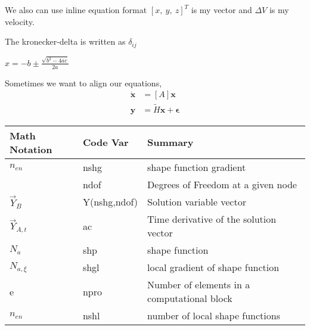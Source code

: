 \documentclass[12pt]{article}
\begin{document}
We also can use inline equation format $[x,~y,~z]^T$ is my vector and $\Delta V$ is my velocity.

The kronecker-delta is written as $\delta _{ij}$

\begin{center}
$x=-b \pm \displaystyle \frac{\sqrt{b^2-4ac}}{2a}$
\end{center}

Sometimes we want to align our equations,
\begin{align}
\dot{\pmb{x}} &= [A]\pmb{x}\\
\pmb{y} &=\tilde{H}\pmb{x} + \pmb{\epsilon}
\end{align}

\begin{tabular}{ | l | l | l |}
		\hline
		Math Notation & Code Var & Summary\\ \hline
		$ n_{en} $ & nshg & shape function gradient\\
		 & ndof & Degrees of Freedom at a given node\\
		$ \vec{Y}_B $ & Y(nshg,ndof) & Solution variable vector\\
		$ \vec{Y}_{A,t} $ & ac & Time derivative of the solution vector\\
		$ N_a $ & shp & shape function\\
		$ N_{a,\xi} $ & shgl & local gradient of shape function\\
		e & npro & Number of elements in a computational block\\
		$ n_{en} $ & nshl & number of local shape functions\\ \hline

\end{tabular}
\end{document}
